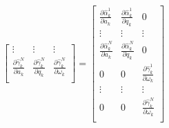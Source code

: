 \documentclass[11pt]{article}
\newcommand{\pd}[2]{\frac{\partial #1}{\partial #2}} %
\begin{document}
\begin{align*}
\begin{bmatrix}
        \vdots & \vdots & \vdots \\
        \pd{\hat{\gamma}^N_k}{a_k} & \pd{\hat{\gamma}^N_k}{q_k} & \pd{\hat{\gamma}^N_k}{\omega_k} \\
    \end{bmatrix} = \begin{bmatrix}
        \pd{\hat{\alpha}^1_k}{a_k} & \pd{\hat{\alpha}^1_k}{q_k} & 0 \\
        \vdots & \vdots & \vdots \\
        \pd{\hat{\alpha}^N_k}{a_k} & \pd{\hat{\alpha}^N_k}{q_k} & 0 \\
        0 & 0 & \pd{\hat{\gamma}^1_k}{\omega_k} \\
        \vdots & \vdots & \vdots \\
        0 & 0 & \pd{\hat{\gamma}^N_k}{\omega_k} \\
    \end{bmatrix} \\
\end{align*}
\end{document}

